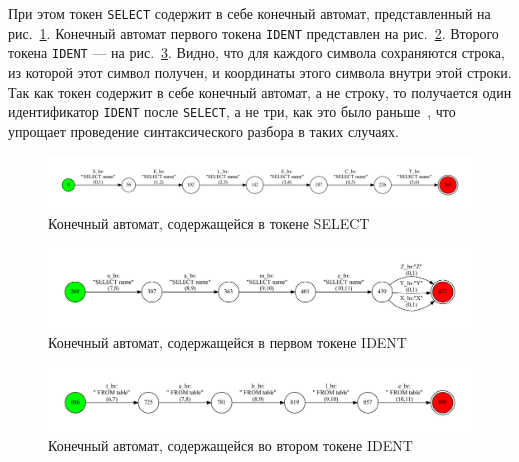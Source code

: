 При этом токен \verb|SELECT| содержит в себе конечный автомат, представленный на рис.~\ref{fig:tsql_select}. Конечный автомат первого токена \verb|IDENT| представлен на рис.~\ref{fig:tsql_ident_1}. Второго токена \verb|IDENT| --- на рис.~\ref{fig:tsql_ident_2}. Видно, что для каждого символа сохраняются строка, из которой этот символ получен, и координаты этого символа внутри этой строки. Так как токен содержит в себе конечный автомат, а не строку, то получается один идентификатор \verb|IDENT| после \verb|SELECT|, а не три, как это было раньше~\cite{Verbitskaya, Polubelova}, что упрощает проведение синтаксического разбора в таких случаях.  

\begin{figure}[H]
\begin{center}
\includegraphics[width=1.0\textwidth]{Polubelova/tsql_select}
\caption{Конечный автомат, содержащейся в токене SELECT}
\label{fig:tsql_select} 
\end{center}
\end{figure}

\begin{figure}[H]
\begin{center}
\includegraphics[width=1.0\textwidth]{Polubelova/tsql_ident_1}
\caption{Конечный автомат, содержащейся в первом токене IDENT}
\label{fig:tsql_ident_1} 
\end{center}
\end{figure}

\begin{figure}[H]
\begin{center}
\includegraphics[width=1.0\textwidth]{Polubelova/tsql_ident_2}
\caption{Конечный автомат, содержащейся во втором токене IDENT}
\label{fig:tsql_ident_2} 
\end{center}
\end{figure}


